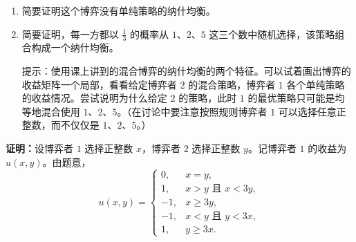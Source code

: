 \documentclass[12pt,a4paper]{article}
\begin{document}
\begin{enumerate}[label=\alph*.]
  \item 简要证明这个博弈没有单纯策略的纳什均衡。
  \item 简要证明，每一方都以 \(\frac{1}{3}\) 的概率从 \(1\)、\(2\)、\(5\) 这三个数中随机选择，该策略组合构成一个纳什均衡。
  
  \noindent 提示：使用课上讲到的混合博弈的纳什均衡的两个特征。可以试着画出博弈的收益矩阵一个局部，看看给定博弈者 \(2\) 的混合策略，博弈者 \(1\) 各个单纯策略的收益情况。尝试说明为什么给定 \(2\) 的策略，此时 \(1\) 的最优策略只可能是均等地混合使用 \(1\)、\(2\)、\(5\)。（在讨论中要注意按照规则博弈者 \(1\) 可以选择任意正整数，而不仅仅是 \(1\)、\(2\)、\(5\)。）
\end{enumerate}

\vspace{0.5cm}

\noindent\textbf{证明：}设博弈者 \(1\) 选择正整数 \(x\)，博弈者 \(2\) 选择正整数 \(y\)。记博弈者 \(1\) 的收益为 \(u(x,y)\)。由题意，
\[
u(x,y)=
\begin{cases}
0, & x=y,\\[4pt]
1, & x>y \text{ 且 } x<3y,\\[4pt]
-1, & x\ge 3y,\\[4pt]
-1, & x<y \text{ 且 } y<3x,\\[4pt]
1, & y\ge 3x.
\end{cases}
\]
\end{document}

